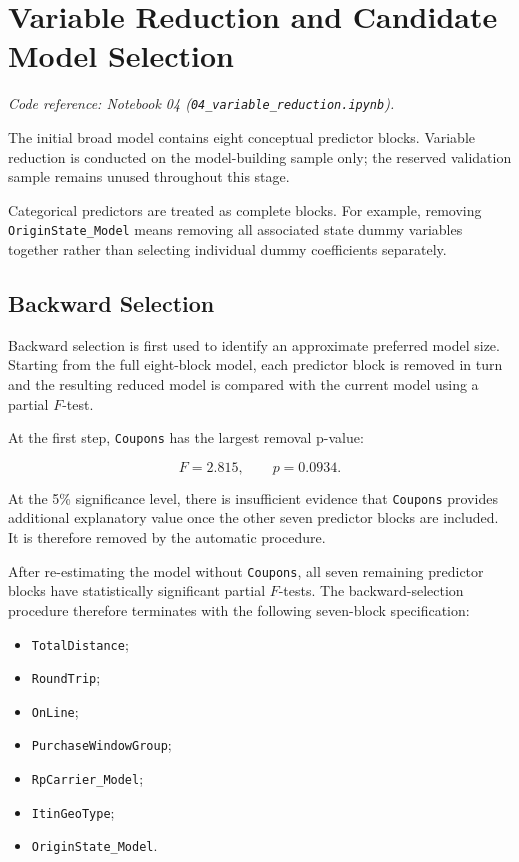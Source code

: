 \documentclass[11pt,a4paper]{article}
\begin{document}

\section{Variable Reduction and Candidate Model Selection}

\noindent\textit{Code reference: Notebook 04 (\texttt{04\_variable\_reduction.ipynb}).}

The initial broad model contains eight conceptual predictor blocks. Variable reduction is conducted on the model-building sample only; the reserved validation sample remains unused throughout this stage.

Categorical predictors are treated as complete blocks. For example, removing \texttt{OriginState\_Model} means removing all associated state dummy variables together rather than selecting individual dummy coefficients separately.

\subsection{Backward Selection}

Backward selection is first used to identify an approximate preferred model size. Starting from the full eight-block model, each predictor block is removed in turn and the resulting reduced model is compared with the current model using a partial \(F\)-test.

At the first step, \texttt{Coupons} has the largest removal p-value:

\[
F = 2.815,
\qquad
p = 0.0934.
\]

At the 5\% significance level, there is insufficient evidence that \texttt{Coupons} provides additional explanatory value once the other seven predictor blocks are included. It is therefore removed by the automatic procedure.

After re-estimating the model without \texttt{Coupons}, all seven remaining predictor blocks have statistically significant partial \(F\)-tests. The backward-selection procedure therefore terminates with the following seven-block specification:

\begin{itemize}
    \item \texttt{TotalDistance};
    \item \texttt{RoundTrip};
    \item \texttt{OnLine};
    \item \texttt{PurchaseWindowGroup};
    \item \texttt{RpCarrier\_Model};
    \item \texttt{ItinGeoType};
    \item \texttt{OriginState\_Model}.
\end{itemize}
\end{document}
